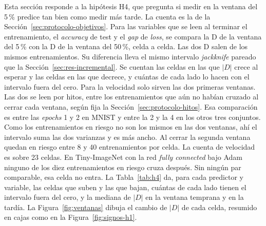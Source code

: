 Esta sección responde a la hipótesis H4, que pregunta si medir en la ventana del 5\,\% predice tan bien como medir más tarde. La cuenta es la de la Sección~\ref{sec:protocolo-objetivos}. Para las variables que se leen al terminar el entrenamiento, el \emph{accuracy} de test y el \emph{gap} de \emph{loss}, se compara la D de la ventana del 5\,\% con la D de la ventana del 50\,\%, celda a celda. Las dos D salen de los mismos entrenamientos. Su diferencia lleva el mismo intervalo \emph{jackknife} pareado que la Sección~\ref{sec:res-incremental}. Se cuentan las celdas en las que $|D|$ crece al esperar y las celdas en las que decrece, y cuántas de cada lado lo hacen con el intervalo fuera del cero. Para la velocidad solo sirven las dos primeras ventanas. Las dos se leen por hitos, entre los entrenamientos que aún no habían cruzado al cerrar cada ventana, según fija la Sección~\ref{sec:protocolo-hitos}. Esa comparación es entre las \emph{epochs} 1 y 2 en MNIST y entre la 2 y la 4 en los otros tres conjuntos. Como los entrenamientos en riesgo no son los mismos en las dos ventanas, ahí el intervalo suma las dos varianzas y es más ancho. Al cerrar la segunda ventana quedan en riesgo entre 8 y 40 entrenamientos por celda. La cuenta de velocidad es sobre 23 celdas. En Tiny-ImageNet con la red \emph{fully connected} bajo Adam ninguno de los diez entrenamientos en riesgo cruza después. Sin ningún par comparable, esa celda no entra. La Tabla~\ref{tab:h4} da, para cada predictor y variable, las celdas que suben y las que bajan, cuántas de cada lado tienen el intervalo fuera del cero, y la mediana de $|D|$ en la ventana temprana y en la tardía. La Figura~\ref{fig:ventanas} dibuja el cambio de $|D|$ de cada celda, resumido en cajas como en la Figura~\ref{fig:signos-h1}.

